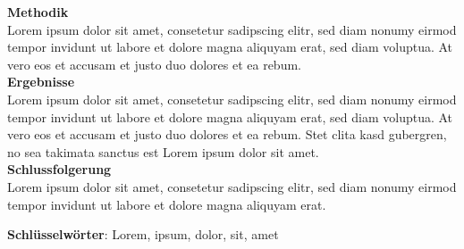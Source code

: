 {{{            \textbf{Methodik}\\
            Lorem ipsum dolor sit amet, consetetur sadipscing elitr, sed diam nonumy eirmod tempor invidunt ut labore et dolore magna aliquyam erat, sed diam voluptua. At vero eos et accusam et justo duo dolores et ea rebum.\\

            \textbf{Ergebnisse}\\
            Lorem ipsum dolor sit amet, consetetur sadipscing elitr, sed diam nonumy eirmod tempor invidunt ut labore et dolore magna aliquyam erat, sed diam voluptua. At vero eos et accusam et justo duo dolores et ea rebum. Stet clita kasd gubergren, no sea takimata sanctus est Lorem ipsum dolor sit amet.\\

            \textbf{Schlussfolgerung}\\
            Lorem ipsum dolor sit amet, consetetur sadipscing elitr, sed diam nonumy eirmod tempor invidunt ut labore et dolore magna aliquyam erat.\\
        }
    }
    \vspace{1cm}
    
    \textbf{Schlüsselwörter}: Lorem, ipsum, dolor, sit, amet

}

